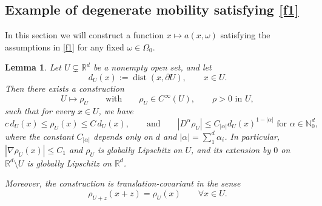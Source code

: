 \documentclass[11pt]{article}
\newtheorem{lemma}[theorem]{Lemma}
\theoremstyle{rem}
\begin{document}
\subsection{Example of degenerate mobility satisfying \ref{f1}}\label{sec exmaple a}
In this section we will construct a function $x\mapsto a(x,\omega)$ satisfying the assumptions in \ref{f1} for any fixed $\omega\in\Omega_0$. 
\begin{lemma}\label{lemma}
Let $U\subsetneq \mathbb R^d$ be a nonempty open set, and let
\[
d_U(x):=\operatorname{dist}(x,\partial U),\qquad x\in U.
\]
Then there exists a construction 
\[
U \mapsto \rho_U \qquad\mbox{with} \qquad \rho_U\in C^\infty(U),\qquad \rho>0 \text{ in }U,
\]
such that for every $x\in U$, we have
\begin{equation}\label{rho est}
c\, d_U(x)\le \rho_U(x)\le C\, d_U(x), \qquad\text{and}\qquad 
|D^\alpha \rho_U|\leq C_{|\alpha|} d_U(x)^{1-|\alpha|} 
 \text{ for }\alpha \in \mathbb N_0^d,  
\end{equation}
where the constant  $ C_{|\alpha|}$  depends only on $d$ and 
 $|\alpha|=\sum_1^d \alpha_i$. In particular, $|\nabla \rho_U(x)|\le C_1$ and $\rho_U$ is globally Lipschitz on $U$, and its extension by $0$ on $\mathbb R^d\setminus U$ is globally Lipschitz on $\mathbb R^d$.

Moreover, the construction is translation-covariant in the sense 
\begin{equation}\label{rho tran}
\rho_{U+z}(x+z)=\rho_U(x) \qquad\forall x\in U.
\end{equation}
\end{lemma} 
\end{document}
